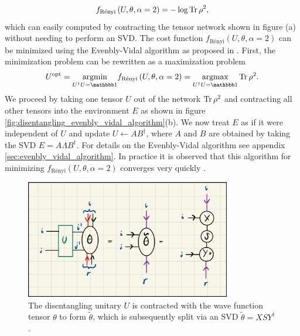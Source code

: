 \begin{equation}
	\label{eq:renyi_entropy_alpha_2}
	f_\text{Rényi}\left(U,\theta,\alpha=2\right) = -\log\operatorname{Tr}\rho^2,
\end{equation}
which can easily computed by contracting the tensor network shown in figure (a) without needing to perform an SVD. The cost function $f_\text{Rényi}\left(U,\theta,\alpha=2\right)$ can be minimized using the Evenbly-Vidal algorithm as proposed in \cite{cite:finding_purifications_with_minimal_entanglement}. First, the minimization problem can be rewritten as a maximization problem
\begin{equation}
	U^\text{opt} = \underset{U^\dagger U = \id}{\argmin} f_\text{Rényi}\left(U,\theta,\alpha=2\right) = \underset{U^\dagger U = \id}{\argmax}\Tr\rho^2.
\end{equation}
We proceed by taking one tensor $U$ out of the network $\operatorname{Tr}\rho^2$ and contracting all other tensors into the environment $E$ as shown in figure \ref{fig:disentangling_evenbly_vidal_algorithm}(b). We now treat $E$ as if it were independent of $U$ and update $U\leftarrow AB^\dagger$, where $A$ and $B$ are obtained by taking the SVD $E=A\Lambda B^\dagger$. For details on the Evenbly-Vidal algorithm see appendix \ref{sec:evenbly_vidal_algorithm}. In practice it is observed that this algorithm for minimizing $f_\text{Rényi}\left(U,\theta,\alpha=2\right)$ converges very quickly \cite{cite:efficient_simulation_of_dynamics_in_two_dimensional_quantum_spin_systems}.\par
\begin{figure}
	\centering
	\includegraphics[width=0.8\textwidth]{figures/disoTPS/disentangling_theta_definition.jpeg}
	\caption{The disentangling unitary $U$ is contracted with the wave function tensor $\theta$ to form $\tilde{\theta}$, which is subsequently split via an SVD $\tilde{\theta} = XSY^\dagger$.}
	\label{fig:disentangling_theta_definition}
\end{figure}
